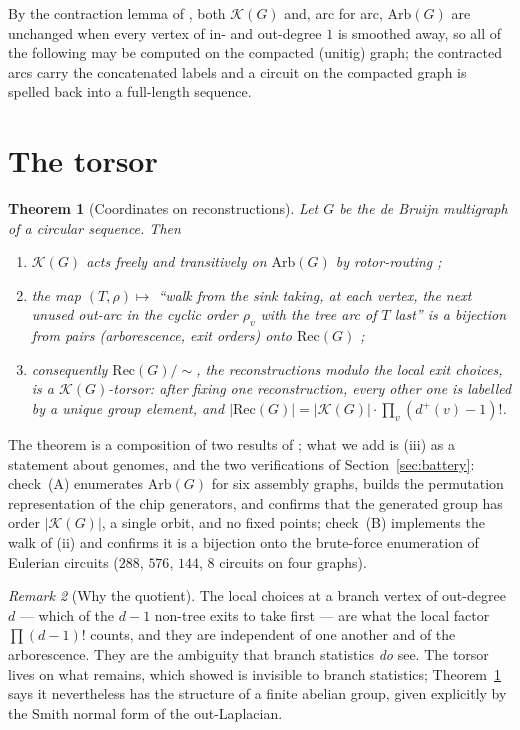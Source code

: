 \documentclass[11pt]{article}
\theoremstyle{plain}
\newtheorem{theorem}{Theorem}
\theoremstyle{definition}
\theoremstyle{remark}
\newtheorem{remark}[theorem]{Remark}
\newcommand{\K}{\mathcal{K}}
\newcommand{\Arb}{\mathrm{Arb}}
\newcommand{\Rec}{\mathrm{Rec}}
\begin{document}
By the contraction lemma of \cite[Lem.~4]{Bio1}, both $\K(G)$ and, arc for arc, $\Arb(G)$
are unchanged when every vertex of in- and out-degree $1$ is smoothed away, so all of the
following may be computed on the compacted (unitig) graph; the contracted arcs carry the
concatenated labels and a circuit on the compacted graph is spelled back into a
full-length sequence.

\section{The torsor}\label{sec:torsor}

\begin{theorem}[Coordinates on reconstructions]\label{thm:torsor}
Let $G$ be the de Bruijn multigraph of a circular sequence. Then
\begin{enumerate}
\item[(i)] $\K(G)$ acts freely and transitively on $\Arb(G)$ by rotor-routing
{\rm\cite[Lem.~3.12, 3.13, 3.17]{HLMPPW}};
\item[(ii)] the map $(T,\rho)\mapsto$ ``walk from the sink taking, at each vertex, the
next unused out-arc in the cyclic order $\rho_v$ with the tree arc of $T$ last'' is a
bijection from pairs (arborescence, exit orders) onto $\Rec(G)$
{\rm\cite[Cor.~4.10]{HLMPPW}};
\item[(iii)] consequently $\Rec(G)/\!\sim$, the reconstructions modulo the local exit
choices, is a $\K(G)$-torsor: after fixing one reconstruction, every other one is labelled
by a unique group element, and $|\Rec(G)|=|\K(G)|\cdot\prod_v(d^+(v)-1)!$.
\end{enumerate}
\end{theorem}

The theorem is a composition of two results of \cite{HLMPPW}; what we add is (iii) as a
statement about genomes, and the two verifications of Section~\ref{sec:battery}: check~(A)
enumerates $\Arb(G)$ for six assembly graphs, builds the permutation representation of the
chip generators, and confirms that the generated group has order $|\K(G)|$, a single orbit,
and no fixed points; check~(B) implements the walk of (ii) and confirms it is a bijection
onto the brute-force enumeration of Eulerian circuits ($288$, $576$, $144$, $8$ circuits on
four graphs).

\begin{remark}[Why the quotient]\label{rem:quotient}
The local choices at a branch vertex of out-degree $d$ --- which of the $d-1$ non-tree
exits to take first --- are what the local factor $\prod(d-1)!$ counts, and they are
independent of one another and of the arborescence. They are the ambiguity that branch
statistics \emph{do} see. The torsor lives on what remains, which \cite{Bio1} showed is
invisible to branch statistics; Theorem~\ref{thm:torsor} says it nevertheless has the
structure of a finite abelian group, given explicitly by the Smith normal form of the
out-Laplacian.
\end{remark}
\end{document}
